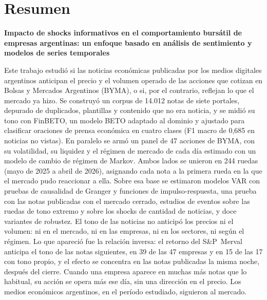 \documentclass[11pt,a4paper,oneside]{report}
\begin{document}
\chapter*{Resumen}
\begin{center}
  {\titulos\large\bfseries Impacto de shocks informativos en el comportamiento bursátil de
  empresas argentinas: un enfoque basado en análisis de sentimiento y modelos de series
  temporales\par}
\end{center}
\vspace{4pt}

Este trabajo estudió si las noticias económicas publicadas por los medios digitales
argentinos anticipan el precio y el volumen operado de las acciones que cotizan en Bolsas y
Mercados Argentinos (BYMA), o si, por el contrario, reflejan lo que el mercado ya hizo. Se
construyó un corpus de 14.012 notas de siete portales, depurado de duplicados, plantillas y
contenido que no era noticia, y se midió su tono con FinBETO, un modelo BETO adaptado al
dominio y ajustado para clasificar oraciones de prensa económica en cuatro clases (F1 macro de
0,685 en noticias no vistas). En paralelo se armó un panel de 47 acciones de BYMA, con su
volatilidad, su liquidez y el régimen de mercado de cada día estimado con un modelo de cambio
de régimen de Markov. Ambos lados se unieron en 244 ruedas (mayo de 2025 a abril de 2026),
asignando cada nota a la primera rueda en la que el mercado pudo reaccionar a ella. Sobre esa
base se estimaron modelos VAR con pruebas de causalidad de Granger y funciones de
impulso-respuesta, una prueba con las notas publicadas con el mercado cerrado, estudios de
eventos sobre las ruedas de tono extremo y sobre los shocks de cantidad de noticias, y doce
variantes de robustez. El tono de las noticias no anticipó los precios ni el volumen: ni en el
mercado, ni en las empresas, ni en los sectores, ni según el régimen. Lo que apareció fue la
relación inversa: el retorno del S\&P~Merval anticipa el tono de las notas siguientes, en 39
de las 47 empresas y en 15 de las 17 con tono propio, y el efecto se concentra en las notas
publicadas la misma noche, después del cierre. Cuando una empresa aparece en muchas más
notas que lo habitual, su acción se opera más ese día, sin una dirección en el precio. Los
medios económicos argentinos, en el período estudiado, siguieron al mercado.
\end{document}
